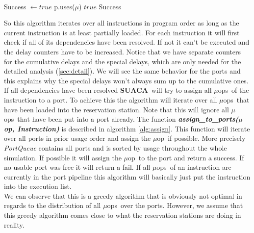 \documentclass[a4paper,12pt,titlepage, twoside]{report}
\newcommand{\suaca}{\textbf{SUACA}}
\newcommand{\microop}{$\mu$op}
\newcommand{\microops}{$\mu$ops}
\begin{document}
~\\[-1em]
\begin{algorithm}[H]
    \label{alg:assign}
    \SetAlgoLined
    \caption{Assign \microop\ to port}
    \Input{\microop\ $\mu$, Instruction $I$}
    Success $\leftarrow true$\;
     {
         {
            p.uses($\mu$)\;
            \Return $true$\;
        }
    }
    \Return Success\;
\end{algorithm}

So this algorithm iterates over all instructions in program order as long as the current instruction is at least partially loaded. For each instruction it will first check if all of its dependencies have been resolved. If not it can't be executed and the delay counters have to be increased. Notice that we have separate counters for the cumulative delays and the special delays, which are only needed for the detailed analysis (\autoref{sec:detail}). We will see the same behavior for the ports and this explains why the special delays won't always sum up to the cumulative ones.\\
If all dependencies have been resolved \suaca\ will try to assign all \microops\ of the instruction to a port. To achieve this the algorithm will iterate over all \microops\ that have been loaded into the reservation station. Note that this will ignore all \microops\ that have been put into a port already. The function \textbf{\emph{assign\_to\_ports(\microop, Instruction)}} is described in algorithm \ref{alg:assign}. This function will iterate over all ports in prior usage order and assign the \microop\ if possible. More precisely \emph{PortQueue} contains all ports and is sorted by usage throughout the whole simulation. If possible it will assign the \microop\ to the port and return a success. If no usable port was free it will return a fail. If all \microops\ of an instruction are currently in the port pipeline this algorithm will basically just put the instruction into the execution list.\\
We can observe that this is a greedy algorithm that is obviously not optimal in regards to the distribution of all \microops\ over the ports. However, we assume that this greedy algorithm comes close to what the reservation stations are doing in reality.\\
\end{document}
